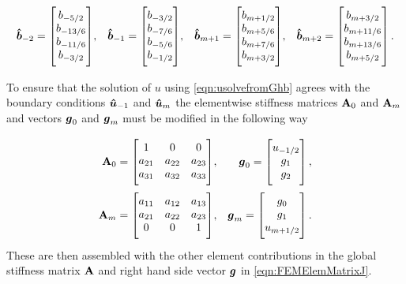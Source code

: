 \begin{align*}
\vecn{\hat{b}}_{-2} = \begin{bmatrix} \TM
b_{-5/2} \\ b_{-13/6} \\ b_{-11/6} \\ b_{-3/2} \BM\end{bmatrix}&, &\vecn{\hat{b}}_{-1} = \begin{bmatrix} \TM
b_{-3/2} \\ b_{-7/6} \\ b_{-5/6} \\ b_{-1/2} \BM\end{bmatrix}&, &\vecn{\hat{b}}_{m+1} = \begin{bmatrix} \TM
b_{m+1/2} \\ b_{m+5/6} \\ b_{m+7/6} \\ b_{m+3/2} \BM\end{bmatrix}&, &\vecn{\hat{b}}_{m+2} = \begin{bmatrix} \TM
b_{m+3/2} \\ b_{m+11/6} \\ b_{m+13/6} \\ b_{m+5/2} \BM\end{bmatrix}.
\end{align*}

To ensure that the solution of $u$ using \eqref{eqn:usolvefromGhb} agrees with the boundary conditions $\boldsymbol{\hat{u}}_{-1}$ and $\boldsymbol{\hat{u}}_{m}$ the elementwise stiffness matrices $\mathbf{A}_0$ and $\mathbf{A}_m$ and vectors $\boldsymbol{g}_0$ and $\boldsymbol{g}_m$ must be modified in the following way 

\begin{align*}
\matr{A}_{0} = 
\begin{bmatrix}
\TM 1 &0 &0 \\
a_{21} & a_{22} & a_{23} \\
a_{31} & a_{32} & a_{33} \BM
\end{bmatrix} &,& \vecn{g}_{0} = \begin{bmatrix}
\TM u_{-1/2} \\
g_1 \\
g_2 \BM
\end{bmatrix},\\
\matr{A}_{m} = 
\begin{bmatrix}
\TM a_{11} & a_{12} & a_{13} \\
a_{21} & a_{22} & a_{23} \\
0 & 0 & 1 \BM
\end{bmatrix} &,& \vecn{g}_{m} = \begin{bmatrix}
\TM g_0\\ 
g_1 \\
u_{m+1/2} \BM
\end{bmatrix}.
\end{align*}
These are then assembled with the other element contributions in the global stiffness matrix $\mathbf{A}$ and right hand side vector $\boldsymbol{g}$ in \eqref{eqn:FEMElemMatrixJ}.
